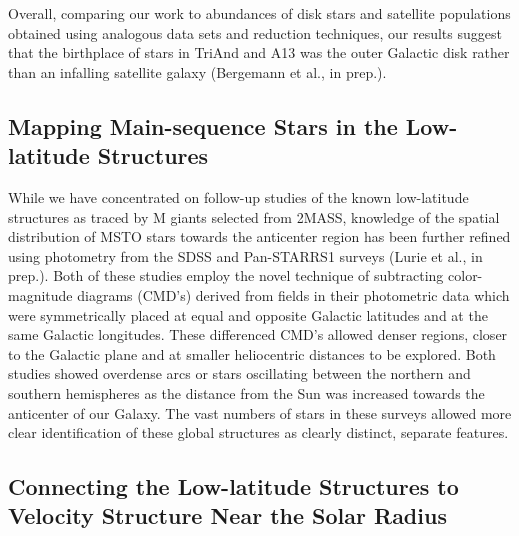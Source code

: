 \documentclass[galaxies,article,submit,moreauthors,pdftex,10pt,a4paper]{mdpi}
\begin{document}
Overall, comparing our work to abundances of disk stars and satellite populations obtained using analogous data sets and reduction techniques, our results suggest that the birthplace of stars in TriAnd and A13 was the outer Galactic disk rather than an infalling satellite galaxy (Bergemann et al., in prep.).


\subsection{Mapping Main-sequence Stars in the Low-latitude Structures}

While we have concentrated on follow-up studies of the known low-latitude structures as traced by M giants selected from 2MASS, knowledge of the spatial distribution of MSTO stars towards the anticenter region has been further refined using photometry from the SDSS \cite{xu15} and Pan-STARRS1 surveys (Lurie et al., in prep.).
Both of these studies employ the novel technique of subtracting color-magnitude diagrams (CMD's) derived from fields in their photometric data which were symmetrically placed at equal and opposite Galactic latitudes and at the same Galactic longitudes.
These differenced CMD's allowed denser regions, closer to the Galactic plane and at smaller heliocentric distances  to be explored.
Both studies showed overdense arcs or stars oscillating between the northern and southern hemispheres as the distance from the Sun was increased towards the anticenter of our Galaxy.
The vast numbers of stars in these surveys allowed more clear identification of these global structures as clearly distinct, separate features.


\subsection{Connecting the Low-latitude Structures to Velocity Structure Near the Solar Radius}
\end{document}
